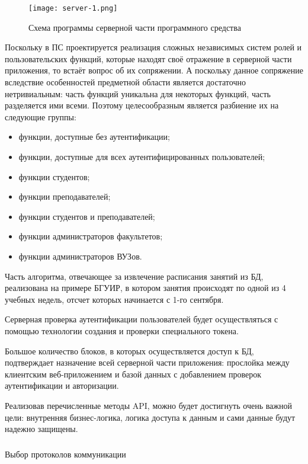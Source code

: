 \begin{sidewaysfigure}
\centering
	\texttt{[image: server-1.png]}
	\caption{Схема программы серверной части программного средства}
	\label{fig:design:server:interface:server_algorithm}
\end{sidewaysfigure}

Поскольку в ПС проектируется реализация сложных независимых систем ролей и пользовательских функций, которые находят своё отражение в серверной части приложения, то встаёт вопрос об их сопряжении. А поскольку данное сопряжение вследствие особенностей предметной области является достаточно нетривиальным: часть функций уникальна для некоторых функций, часть разделяется ими всеми. Поэтому целесообразным является разбиение их на следующие группы:

\begin{itemize}
	\item функции, доступные без аутентификации;
	\item функции, доступные для всех аутентифицированных пользователей;
	\item функции студентов;
	\item функции преподавателей;
	\item функции студентов и преподавателей;
	\item функции администраторов факультетов;
	\item функции администраторов ВУЗов.
\end{itemize}

Часть алгоритма, отвечающее за извлечение расписания занятий из БД, реализована на примере БГУИР, в котором занятия происходят по одной из 4 учебных недель, отсчет которых начинается с 1-го сентября.

Серверная проверка аутентификации пользователей будет осуществляться с помощью технологии создания и проверки специального токена.

Большое количество блоков, в которых осуществляется доступ к БД, подтверждает назначение всей серверной части приложения: прослойка между клиентским веб-приложением и базой данных с добавлением проверок аутентификации и авторизации.

Реализовав перечисленные методы API, можно будет достигнуть очень важной цели: внутренняя бизнес-логика, логика доступа к данным и сами данные будут надежно защищены.

\subsubsection{} Выбор протоколов коммуникации
\label{sec:design:server:protocols}

